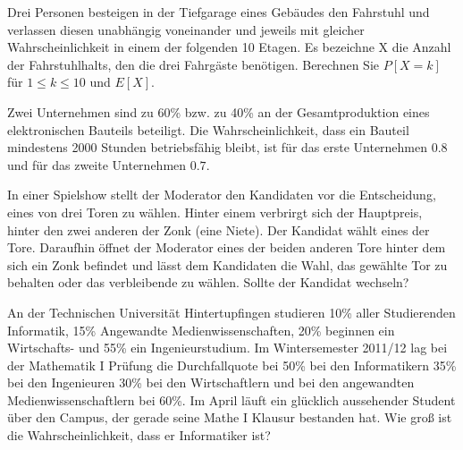 \documentclass[10pt, a4paper]{exam}
\begin{document}
\begin{questions}
    \question Drei Personen besteigen in der Tiefgarage eines Gebäudes den Fahrstuhl und verlassen diesen unabhängig voneinander und jeweils mit gleicher Wahrscheinlichkeit in einem der folgenden 10 Etagen. Es bezeichne X die Anzahl der Fahrstuhlhalts, den die drei Fahrgäste benötigen. Berechnen Sie $P[X=k]$ für $1\leq k\leq 10$ und $E[X]$.

    \question Zwei Unternehmen sind zu 60\% bzw. zu 40\% an der Gesamtproduktion eines elektronischen Bauteils beteiligt. Die Wahrscheinlichkeit, dass ein Bauteil mindestens 2000 Stunden betriebsfähig bleibt, ist für das erste Unternehmen $0.8$ und für das zweite Unternehmen $0.7$.

    \question In einer Spielshow stellt der Moderator den Kandidaten vor die Entscheidung, eines von drei Toren zu wählen. Hinter einem verbrirgt sich der Hauptpreis, hinter den zwei anderen der Zonk (eine Niete). Der Kandidat wählt eines der Tore. Daraufhin öffnet der Moderator eines der beiden anderen Tore hinter dem sich ein Zonk befindet und lässt dem Kandidaten die Wahl, das gewählte Tor zu behalten oder das verbleibende zu wählen. Sollte der Kandidat wechseln?

    \question An der Technischen Universität Hintertupfingen studieren 10\% aller Studierenden Informatik, 15\% Angewandte Medienwissenschaften, 20\% beginnen ein Wirtschafts- und 55\% ein Ingenieurstudium. Im Wintersemester 2011/12 lag bei der Mathematik I Prüfung die Durchfallquote bei 50\% bei den Informatikern 35\% bei den Ingenieuren 30\% bei den Wirtschaftlern und bei den angewandten Medienwissenschaftlern bei 60\%. Im April läuft ein glücklich aussehender Student über den Campus, der gerade seine Mathe I Klausur bestanden hat. Wie groß ist die Wahrscheinlichkeit, dass er Informatiker ist?


\end{questions}
\end{document}
